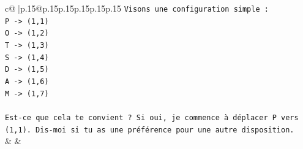 \documentclass{article}
\begin{document}
{\begin{supertabular}{c@{$\;$}|p{.15\linewidth}@{}p{.15\linewidth}p{.15\linewidth}p{.15\linewidth}p{.15\linewidth}p{.15\linewidth}}
{{{\texttt{Visons une configuration simple :} \\
\texttt{P {-}> (1,1)} \\
\texttt{O {-}> (1,2)} \\
\texttt{T {-}> (1,3)} \\
\texttt{S {-}> (1,4)} \\
\texttt{D {-}> (1,5)} \\
\texttt{A {-}> (1,6)} \\
\texttt{M {-}> (1,7)} \\
\\ 
\texttt{Est{-}ce que cela te convient ? Si oui, je commence à déplacer P vers (1,1). Dis{-}moi si tu as une préférence pour une autre disposition.} \\
            }
        }
    }
    & & \\ \\


\end{supertabular}}
\end{document}
